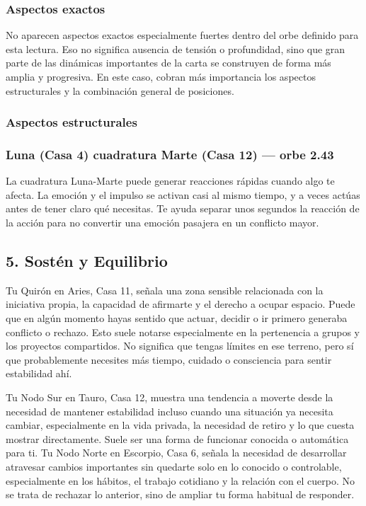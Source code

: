 \documentclass[11pt,a4paper]{article}\usepackage[utf8]{inputenc}
\begin{document}
\subsubsection*{Aspectos exactos}
No aparecen aspectos exactos especialmente fuertes dentro del orbe definido para esta lectura. Eso no significa ausencia de tensión o profundidad, sino que gran parte de las dinámicas importantes de la carta se construyen de forma más amplia y progresiva. En este caso, cobran más importancia los aspectos estructurales y la combinación general de posiciones.

\subsubsection*{Aspectos estructurales}
\subsubsection*{Luna (Casa 4) cuadratura Marte (Casa 12) --- orbe 2.43\textdegree}
La cuadratura Luna-Marte puede generar reacciones rápidas cuando algo te afecta. La emoción y el impulso se activan casi al mismo tiempo, y a veces actúas antes de tener claro qué necesitas. Te ayuda separar unos segundos la reacción de la acción para no convertir una emoción pasajera en un conflicto mayor.



\subsection{5. Sostén y Equilibrio}

Tu Quirón en Aries, Casa 11, señala una zona sensible relacionada con la iniciativa propia, la capacidad de afirmarte y el derecho a ocupar espacio. Puede que en algún momento hayas sentido que actuar, decidir o ir primero generaba conflicto o rechazo. Esto suele notarse especialmente en la pertenencia a grupos y los proyectos compartidos. No significa que tengas límites en ese terreno, pero sí que probablemente necesites más tiempo, cuidado o consciencia para sentir estabilidad ahí.

\vspace{0.3cm}
Tu Nodo Sur en Tauro, Casa 12, muestra una tendencia a moverte desde la necesidad de mantener estabilidad incluso cuando una situación ya necesita cambiar, especialmente en la vida privada, la necesidad de retiro y lo que cuesta mostrar directamente. Suele ser una forma de funcionar conocida o automática para ti. Tu Nodo Norte en Escorpio, Casa 6, señala la necesidad de desarrollar atravesar cambios importantes sin quedarte solo en lo conocido o controlable, especialmente en los hábitos, el trabajo cotidiano y la relación con el cuerpo. No se trata de rechazar lo anterior, sino de ampliar tu forma habitual de responder.
\end{document}
